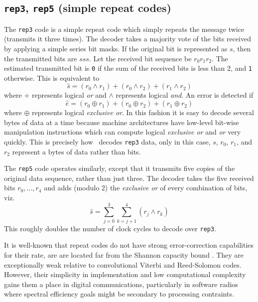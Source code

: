 \subsection{{\tt rep3}, {\tt rep5} (simple repeat codes)}
\label{module:fec:rep}
The {\tt rep3} code is a simple repeat code which simply repeats the message
twice (transmits it three times).
The decoder takes a majority vote of the bits received by applying a simple
series bit masks.
If the original bit is represented as $s$, then the transmitted bits are
$s s s$.
Let the received bit sequence be $r_0 r_1 r_2$.
The estimated transmitted bit is {\tt 0} if the sum of the received bits is
less than 2, and {\tt 1} otherwise.
This is equivalent to
\[
    \hat{s} =   (r_0 \land r_1) + 
                (r_0 \land r_2) + 
                (r_1 \land r_2) 
\]
where $+$ represents logical {\it or} and $\land$ represents
logical {\it and}.
An error is detected if
\[
    \hat{e} =   (r_0 \oplus r_1) + 
                (r_0 \oplus r_2) + 
                (r_1 \oplus r_2) 
\]
where $\oplus$ represents logical {\it exclusive or}.
In this fashion it is easy to decode several bytes of data at a time because
machine architectures have low-level bit-wise manipulation instructions which
can compute logical {\it exclusive or} and {\it or} very quickly.
This is precisely how \liquid\ decodes {\tt rep3} data, only in this case,
$s$, $r_0$, $r_1$, and $r_2$ represent a bytes of data rather than bits.

The {\tt rep5} code operates similarly, except that it transmits five copies
of the original data sequence, rather than just three.
The decoder takes the five received bits $r_0,\ldots,r_4$ and adds (modulo
2) the {\it exclusive or} of every combination of bits, viz.
\[
    \hat{s} =   \sum_{j=0}^{3} {
                    \sum_{k=j+1}^{4} {
                        (r_j \land r_k)
                    }
                }
\]
This roughly doubles the number of clock cycles to decode over {\tt rep3}.

It is well-known that repeat codes do not have strong error-correction
capabilities for their rate, are are located far from the Shannon capacity
bound \cite{Proakis:2001}.
They are exceptionally weak relative to convolutional Viterbi and Reed-Solomon
codes.
However, their simplicity in implementation and low computational complexity
gains them a place in digital communications, particularly in software radios
where spectral efficiency goals might be secondary to processing contraints.

